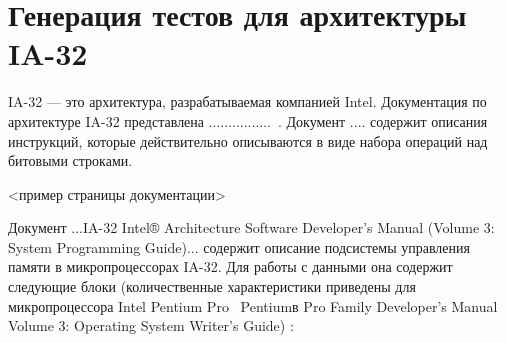 \documentclass[14pt]{extreport}
\begin{document}
\section{Генерация тестов для архитектуры IA-32}

IA-32 --- это архитектура, разрабатываемая компанией Intel. Документация по архитектуре IA-32 представлена ................~\cite{??????????}. Документ
.... содержит описания инструкций, которые действительно описываются в виде набора
операций над битовыми строками.

<пример страницы документации>

Документ ...IA-32 Intel® Architecture Software Developer's Manual (Volume 3: System Programming Guide)... содержит описание подсистемы управления памяти в микропроцессорах IA-32. Для работы с данными она содержит следующие блоки (количественные характеристики приведены для микропроцессора Intel Pentium Pro~\cite{????????} Pentiumв Pro Family
Developer’s Manual Volume 3: Operating System Writer’s Guide) :
\end{document}
